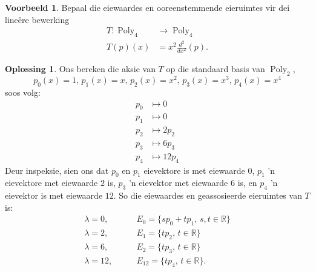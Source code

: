 \documentclass[a4paper,11pt]{book}
\theoremstyle{definition}
\newtheorem{example_environment}{Voorbeeld}[chapter]
\newtheorem*{solution}{Oplossing}
\newenvironment{example}
	{
		\begin{oframed}
		\begin{example_environment}
	}
	{
		\end{example_environment}
		\end{oframed}
	}
\DeclareMathOperator{\Poly}{Poly}
\begin{document}
\begin{example} Bepaal die eiewaardes en ooreenstemmende eieruimtes vir dei
	line{\^e}re bewerking
	\begin{align*}
		T : \Poly_4 & \rightarrow \Poly_4 \\
		T(p)(x) &= x^2 \frac{d^2}{dx^2} (p). 
	\end{align*}
	\begin{solution}
		Ons bereken die aksie van $T$ op die standaard basis van $\Poly_2$,
		\[
			p_0(x) = 1, \, p_1 (x) = x, \, p_2(x) = x^2, \, p_3(x) = x^3,
			\, p_4(x) = x^4
		\]
		soos volg:
		\begin{align*}
			p_0 & \mapsto 0 \\
			p_1 & \mapsto 0 \\
			p_2 & \mapsto 2p_2 \\
			p_3 &\mapsto 6p_3 \\
			p_4 & \mapsto 12 p_4 
		\end{align*}
		Deur inspeksie, sien ons dat $p_0$ en $p_1$ eievektore is met
		eiewaarde $0$, $p_1$ 'n eievektore met eiewaarde $2$ is, $p_3$ 'n
		eievektor met eiewaarde $6$ is, en $p_4$ 'n eievektor is met
		eiewaarde $12$. So die eiewaardes en geassosieerde eieruimtes van
		$T$ is:
		\begin{align*}
			\lambda = 0, & \qquad E_0 = \{s p_0 + t p_1, \, s,t \in
			\mathbb{R} \} \\
			\lambda = 2, & \qquad E_1 = \{t p_2, \, t \in \mathbb{R} \} \\
			\lambda = 6, & \qquad E_2 = \{t p_3, \, t \in \mathbb{R} \} \\
			\lambda = 12, & \qquad E_12 = \{t p_4, \, t \in \mathbb{R} \}. 
		\end{align*}
	\end{solution}

\end{example}
\end{document}
